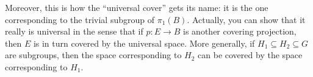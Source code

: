 Moreover, this is how the ``universal cover'' gets its name:
it is the one corresponding to the trivial subgroup of $\pi_1(B)$.
Actually, you can show that it really is universal in the sense
that if $p \colon E \to B$ is another covering projection,
then $E$ is in turn covered by the universal space.
More generally, if $H_1 \subseteq H_2 \subseteq G$ are subgroups,
then the space corresponding to $H_2$ can be covered by the space
corresponding to $H_1$.


\section{\problemhead}
